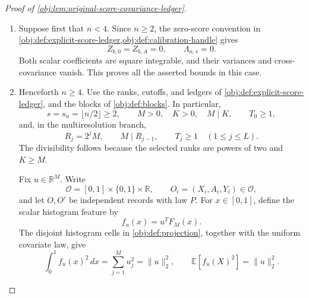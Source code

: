 \documentclass[11pt]{article}
\begin{document}
\begin{proof}[Proof of \cref{obj:lem:original-score-covariance-ledger}]
\begin{enumerate}
\item Suppose first that \(n<4\). Since \(n\ge2\), the zero-score convention in \cref{obj:def:explicit-score-ledger,obj:def:calibration-handle} gives
\[
Z_{b,0}=Z_{b,A}=0,
\qquad
\Lambda_{n,v}=0.
\]
Both scalar coefficients are square integrable, and their variances and cross-covariance vanish. This proves all the asserted bounds in this case.

\item Henceforth \(n\ge4\). Use the ranks, cutoffs, and ledgers of \cref{obj:def:explicit-score-ledger}, and the blocks of \cref{obj:def:blocks}. In particular,
\[
s=s_n=\lfloor n/2\rfloor\ge2,
\qquad
M>0,\quad K>0,\quad M\mid K,
\qquad
T_0\ge1,
\]
and, in the multiresolution branch,
\[
R_j=2^jM,\qquad M\mid R_{j-1},\qquad T_j\ge1
\quad(1\le j\le L).
\]
The divisibility follows because the selected ranks are powers of two and \(K\ge M\).

Fix \(u\in\mathbb R^M\). Write
\[
\mathcal O=[0,1]\times\{0,1\}\times\mathbb R,
\qquad
O_i=(X_i,A_i,Y_i)\in\mathcal O,
\]
and let \(O,O'\) be independent records with law \(P\). For \(x\in[0,1]\), define the scalar histogram feature by
\[
f_u(x)=u^TF_M(x).
\]
The disjoint histogram cells in \cref{obj:def:projection}, together with the uniform covariate law, give
\[
\int_0^1 f_u(x)^2\,dx
=
\sum_{j=1}^{M}u_j^2
=
\|u\|_2^2,
\qquad
\mathbb E[f_u(X)^2]=\|u\|_2^2.
\]


\end{enumerate}
\end{proof}
\end{document}
